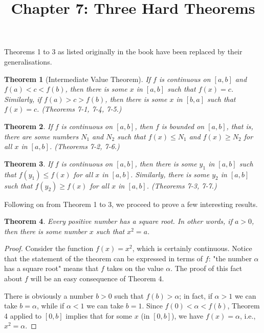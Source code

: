 \documentclass{article}
\newtheorem{theorem}{Theorem}
\begin{document}
\title{Chapter 7: Three Hard Theorems}
\maketitle

Theorems 1 to 3 as listed originally in the book have been replaced by their
generalisations.

\begin{theorem}[Intermediate Value Theorem]
  If $f$ is continuous on $[a, b]$ and $f(a) < c < f(b)$, then there is some
  $x$ in $[a, b]$ such that $f(x) = c$. Similarly, if $f(a) > c > f(b)$, then
  there is some $x$ in $[b, a]$ such that $f(x) = c$.
  (Theorems 7-1, 7-4, 7-5.)
\end{theorem}

\begin{theorem}
  If $f$ is continuous on $[a, b]$, then $f$ is bounded on $[a, b]$, that
  is, there are some numbers $N_1$ and $N_2$ such that $f(x) \leq N_1$ and
  $f(x) \geq N_2$ for all $x$ in $[a, b]$. (Theorems 7-2, 7-6.)
\end{theorem}

\begin{theorem}
  If $f$ is continuous on $[a, b]$, then there is some $y_1$ in $[a, b]$ such
  that $f(y_1) \leq f(x)$ for all $x$ in $[a, b]$. Similarly, there is some
  $y_2$ in $[a, b]$ such that $f(y_2) \geq f(x)$ for all $x$ in $[a, b]$.
  (Theorems 7-3, 7-7.)
\end{theorem}

Following on from Theorem 1 to 3, we proceed to prove a few interesting
results.

\setcounter{theorem}{7}
\begin{theorem}
  Every positive number has a square root. In other words, if $a > 0$, then
  there is some number $x$ such that $x^2 = a$.
\end{theorem}

\begin{proof}
  Consider the function $f(x) = x^2$, which is certainly continuous. Notice
  that the statement of the theorem can be expressed in terms of $f$: "the
  number $\alpha$ has a square root" means that $f$ takes on the value
  $\alpha$. The proof of this fact about $f$ will be an easy consequence of
  Theorem 4.

  There is obviously a number $b > 0$ such that $f(b) > \alpha$; in fact, if
  $\alpha > 1$ we can take $b = \alpha$, while if $\alpha < 1$ we can take $b =
  1$. Since $f(0) < \alpha < f(b)$, Theorem 4 applied to $[0, b]$ implies that
  for some $x$ (in $[0, b]$), we have $f(x) = \alpha$, i.e., $x^2 = \alpha$.
\end{proof}
\end{document}
